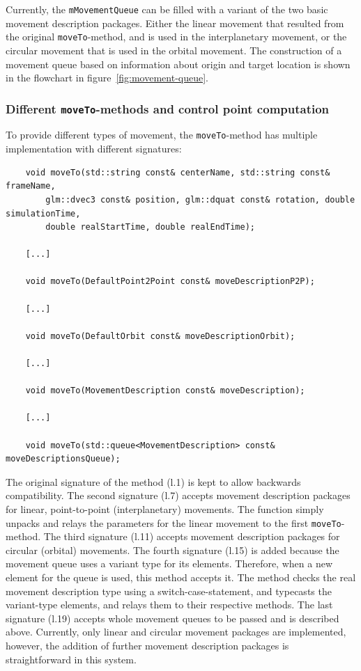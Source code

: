 Currently, the \texttt{mMovementQueue} can be filled with a variant of the two basic movement description
packages.
Either the linear movement that resulted from the original \texttt{moveTo}-method, and is used in the
interplanetary movement, or the circular movement that is used in the orbital movement.
The construction of a movement queue based on information about origin and target location is shown in the
flowchart in figure~\ref{fig:movement-queue}.

\subsubsection{Different \texttt{moveTo}-methods and control point computation}\label{subsubsec:different-moveto-methods-and-control-point-computation}

To provide different types of movement, the \texttt{moveTo}-method has multiple implementation with different
signatures:
\begin{verbatim}
    void moveTo(std::string const& centerName, std::string const& frameName,
        glm::dvec3 const& position, glm::dquat const& rotation, double simulationTime,
        double realStartTime, double realEndTime);

    [...]

    void moveTo(DefaultPoint2Point const& moveDescriptionP2P);

    [...]

    void moveTo(DefaultOrbit const& moveDescriptionOrbit);

    [...]

    void moveTo(MovementDescription const& moveDescription);

    [...]

    void moveTo(std::queue<MovementDescription> const& moveDescriptionsQueue);
\end{verbatim}
The original signature of the method (l.\@1) is kept to allow backwards compatibility.
The second signature (l.\@7) accepts movement description packages for linear, point-to-point (interplanetary)
movements.
The function simply unpacks and relays the parameters for the linear movement to the first \texttt{moveTo}-method.
The third signature (l.\@11) accepts movement description packages for circular (orbital) movements.
The fourth signature (l.\@15) is added because the movement queue uses a variant type for its elements.
Therefore, when a new element for the queue is used, this method accepts it.
The method checks the real movement description type using a switch-case-statement, and typecasts the variant-type
elements, and relays them to their respective methods.
The last signature (l.\@19) accepts whole movement queues to be passed and is described above.
Currently, only linear and circular movement packages are implemented, however, the addition of further movement
description packages is straightforward in this system.

